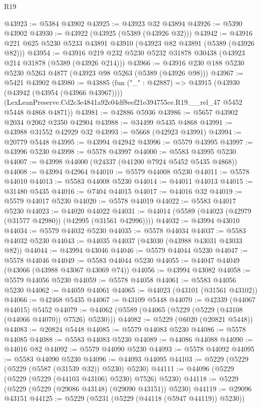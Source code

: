 \begin{lexlean}{R19}
\begin{coremodule}
@43923 := @5384 @43902
@43925 := @43923 @32 @43894
@43926 := @5390 @43902
@43930 := @43922 (@43925 (@5389 (@43926 @32)))
@43942 := @43916 @221 @625 @5230 @5233 @43891 @43910 (@43923 @82 @43891 (@5389 (@43926 @82)))
@43954 := @43916 @219 @232 @5230 @5232 @31878 @30438 (@43923 @214 @31878 (@5389 (@43926 @214)))
@43966 := @43916 @230 @188 @5230 @5230 @5263 @4877 (@43923 @98 @5263 (@5389 (@43926 @98)))
@43967 := @5421 @43902
@43980 := @43885
    (fun ("_" : @42887) =>
    @43915
      (@43930 (@43942 (@43954 (@43966 @43967))))
      (LexLeanPreserve.Cd2c3e4841a92e04df8eef21e394755ce.R19.__rel_47 @5452 @5448 @4868 @4871))
@43981 := @42886 @5936
@43986 := @5657 @43902 @2034 @2062 @2350 @42904
@43988 := @34499 @5435 @4868
@43991 := @43988 @31552 @42929 @32
@43993 := @5668 (@42923 @43991)
@43994 := @20779 @5448
@43995 := @43994 @42942
@43996 := @5579 @43995
@43997 := @43996 @5230
@43998 := @5578 @43997
@44000 := @5583 @43995 @5230
@44007 := @43998 @44000 (@24337 (@41200 @7924 @5452 @5435 @4868))
@44008 := @43994 @42964
@44010 := @5579 @44008 @5230
@44011 := @5578 @44010
@44013 := @5583 @44008 @5230
@44014 := @44011 @44013
@44015 := @31480 @5435
@44016 := @7404 @44015
@44017 := @44016 @32
@44019 := @5579 @44017 @5230
@44020 := @5578 @44019
@44022 := @5583 @44017 @5230
@44023 := @44020 @44022
@44031 := @44014 (@5589 (@44023 (@42979 (@31577 @42980)) (@42995 (@31561 @42996))))
@44032 := @43994 @43010
@44034 := @5579 @44032 @5230
@44035 := @5578 @44034
@44037 := @5583 @44032 @5230
@44043 := @44035 @44037 (@43030 (@43988 @43031 @43033 @82))
@44044 := @43994 @43046
@44046 := @5579 @44044 @5230
@44047 := @5578 @44046
@44049 := @5583 @44044 @5230
@44055 := @44047 @44049 (@43066 (@43988 @43067 @43069 @74))
@44056 := @43994 @43082
@44058 := @5579 @44056 @5230
@44059 := @5578 @44058
@44061 := @5583 @44056 @5230
@44062 := @44059 @44061
@44065 := @44023 (@43101 (@31561 @43102))
@44066 := @42468 @5435
@44067 := @43109 @5448
@44070 := @42339 (@44067 @44015) @5452
@44079 := @44062 (@5589 (@44065 (@5229 (@5229 (@43108 (@44066 @44070)) @7526) @5230)))
@44082 := @5229 (@6020 (@20821 @5448))
@44083 := @20824 @5448
@44085 := @5579 @44083 @5230
@44086 := @5578 @44085
@44088 := @5583 @44083 @5230
@44089 := @44086 @44088
@44090 := @44016 @82
@44092 := @5579 @44090 @5230
@44093 := @5578 @44092
@44095 := @5583 @44090 @5230
@44096 := @44093 @44095
@44103 := @5229 (@5229 (@5229 (@5587 (@31539 @32)) @5230) @5230)
@44111 := @44096 (@5229 (@5229 (@5229 (@44103 @43106) @5230) @7526) @5230)
@44118 := @5229 (@5229 (@5229 (@29086 @43148) (@29090 @43151)) @5230)
@44119 := @29096 @43151
@44125 := @5229 (@5231 (@5229 (@44118 (@5947 @44119)) @5230))

\end{coremodule}
\end{lexlean}
